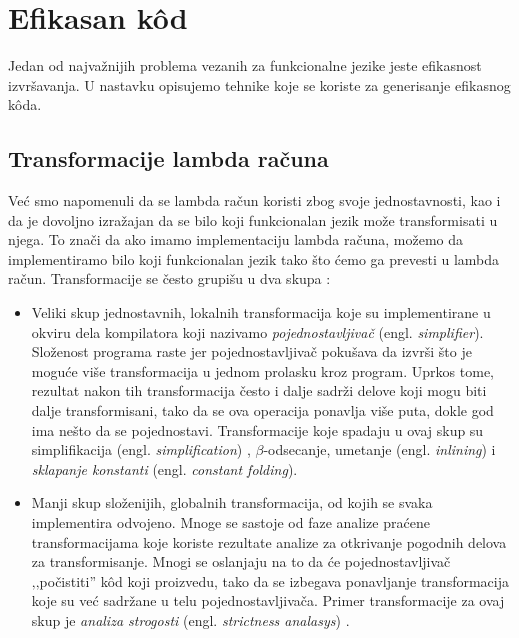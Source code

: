 \documentclass[a4paper]{article}
\begin{document}
\section{Efikasan k\^od}
\label{sec:efikasan kod}

Jedan od najvažnijih problema vezanih za funkcionalne jezike jeste efikasnost izvršavanja. U nastavku opisujemo tehnike koje se koriste za generisanje efikasnog k\^oda.	


\subsection{Transformacije lambda računa}

Već smo napomenuli da se lambda račun koristi zbog svoje jednostavnosti, kao i da je dovoljno izražajan da se bilo koji funkcionalan jezik može transformisati u njega. To znači da ako imamo implementaciju lambda računa, možemo da implementiramo bilo koji funkcionalan jezik tako što ćemo ga prevesti u lambda račun. Transformacije se često grupišu u dva skupa \cite{compilation-by-program-transformation}:

\begin{itemize}
	\item Veliki skup jednostavnih, lokalnih transformacija koje su implementirane u okviru dela kompilatora koji nazivamo \textit{pojednostavljivač} (engl. \textit{simplifier}). Složenost programa raste jer pojednostavljivač pokušava da izvrši što je moguće više transformacija u jednom prolasku kroz program. Uprkos tome, rezultat nakon tih transformacija često i dalje sadrži delove koji mogu biti dalje transformisani, tako da se ova operacija ponavlja više puta, dokle god ima nešto da se pojednostavi. Transformacije koje spadaju u ovaj skup su simplifikacija (engl. \textit{simplification}) \cite{compilation-by-program-transformation}, $\beta$-odsecanje, umetanje (engl. \textit{inlining}) i \textit{sklapanje konstanti} (engl. \textit{constant folding}).
	
	\item Manji skup složenijih, globalnih transformacija, od kojih se svaka implementira odvojeno. Mnoge se sastoje od faze analize praćene transformacijama koje koriste rezultate analize za otkrivanje pogodnih delova za transformisanje. Mnogi se oslanjaju na to da će pojednostavljivač ‚‚počistiti'' k\^ od koji proizvedu, tako da se izbegava ponavljanje transformacija koje su već sadržane u telu pojednostavljivača. Primer transformacije za ovaj skup je  \textit{analiza strogosti} (engl. \textit{strictness analasys}) \cite{haskell-by-program-transformation}. 
\end{itemize}
\end{document}
